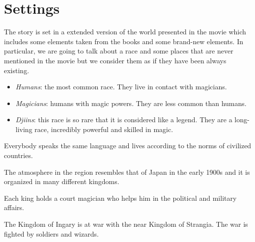 \section{Settings}
The story is set in a extended version of the world presented in the movie which includes some elements taken from the books and some brand-new elements. In particular, we are going to talk about a race and some places that are never mentioned in the movie but we consider them as if they have been always existing.


\begin{itemize}
	\item \textit{Humans}: the most common race. They live in contact with magicians.

	\item \textit{Magicians}: humans with magic powers. They are less common than humans.

	\item \textit{Djiins}: this race is so rare that it is considered like a legend. They are a long-living race, incredibly powerful and skilled in magic.
\end{itemize}

Everybody speaks the same language and lives according to the norms of civilized countries.

The atmosphere in the region resembles that of Japan in the early 1900s and it is organized in many different kingdoms.

Each king holds a court magician who helps him in the political and military affairs.


The Kingdom of Ingary is at war with the near Kingdom of Strangia. The war is fighted by soldiers and wizards.



